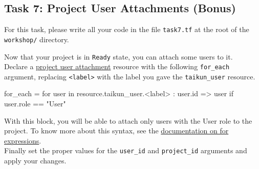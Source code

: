 \subsection{Task 7: Project User Attachments (Bonus)}\label{sec:task7}

\begin{note}
For this task, please write all your code in the file \texttt{task7.tf}
at the root of the \texttt{workshop/} directory.
\end{note}

Now that your project is in \texttt{Ready} state, you can attach some users to it.\\

Declare a \href{https://intuinewin.github.io/taikun-docs/resources/project_user_attachment.html}{project user attachment}
resource with the following \texttt{for\_each} argument, replacing \texttt{<label>} with the label you gave
the \texttt{taikun\_user} resource.
\begin{tf}
  for_each = {
    for user in resource.taikun_user.<label> : user.id => user
    if user.role == "User"
  }
\end{tf}
With this block, you will be able to attach only users with the User role to the project.
To know more about this syntax, see the
\href{https://www.terraform.io/docs/language/expressions/for.html}{documentation on for expressions}.\\

Finally set the proper values for the \texttt{user\_id} and \texttt{project\_id} arguments
and apply your changes.
